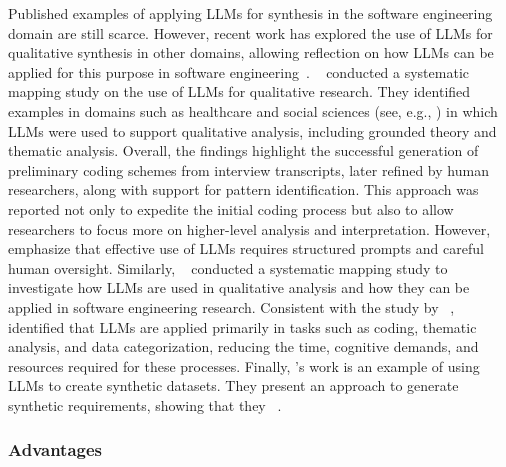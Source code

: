 Published examples of applying LLMs for synthesis in the software engineering domain are still scarce.
However, recent work has explored the use of LLMs for qualitative synthesis in other domains, allowing reflection on how LLMs can be applied for this purpose in software engineering~\cite{DBLP:journals/ase/BanoHZT24}.
\citeauthor{barros2024largelanguagemodelqualitative}~\cite{barros2024largelanguagemodelqualitative} conducted a systematic mapping study on the use of LLMs for qualitative research.
They identified examples in domains such as healthcare and social sciences (see, e.g., \cite{de2024performing,mathis2024inductive}) in which LLMs were used to support qualitative analysis, including grounded theory and thematic analysis.
Overall, the findings highlight the successful generation of preliminary coding schemes from interview transcripts, later refined by human researchers, along with support for pattern identification.
This approach was reported not only to expedite the initial coding process but also to allow researchers to focus more on higher-level analysis and interpretation.
However, \citeauthor{barros2024largelanguagemodelqualitative} emphasize that effective use of LLMs requires structured prompts and careful human oversight.
Similarly, \citeauthor{leça2024applicationsimplicationslargelanguage}~\cite{leça2024applicationsimplicationslargelanguage} conducted a systematic mapping study to investigate how LLMs are used in qualitative analysis and how they can be applied in software engineering research.
Consistent with the study by \citeauthor{barros2024largelanguagemodelqualitative}~\cite{barros2024largelanguagemodelqualitative}, \citeauthor{leça2024applicationsimplicationslargelanguage} identified that LLMs are applied primarily in tasks such as coding, thematic analysis, and data categorization, reducing the time, cognitive demands, and resources required for these processes.
Finally, \citeauthor{DBLP:journals/corr/abs-2506-21138}'s work is an example of using LLMs to create synthetic datasets.
They present an approach to generate synthetic requirements, showing that they ~\cite{DBLP:journals/corr/abs-2506-21138}.

\subsubsection{Advantages}

